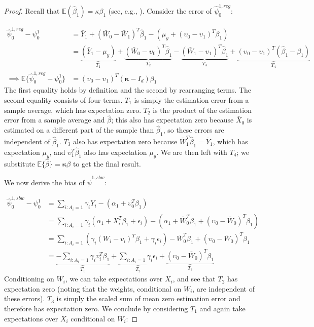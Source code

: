 \begin{proof}
Recall that $\mathbb{E}(\hat{\beta}_1) = \kappa\beta_1$ (see, e.g., \cite{gleser1992importance}). Consider the error of $\hat{\psi}^{1, reg}_0$: 

\begin{align*}
    \hat{\psi}^{1, reg}_0 - \psi^1_0 &= \bar{Y}_1 + (\bar{W}_0 - \bar{W}_1)^T\hat{\beta}_1 - (\mu_y + (\upsilon_0 - \upsilon_1)^T\beta_1) \\
    &= \underbrace{(\bar{Y}_1 - \mu_y)}_{T_1} + \underbrace{(\bar{W}_0 - \upsilon_0)^T\hat{\beta}_1}_{T_2} - \underbrace{(\bar{W}_1 - \upsilon_1)^T\hat{\beta}_1}_{T_3} + \underbrace{(\upsilon_0 - \upsilon_1)^T(\hat{\beta}_1 - \beta_1)}_{T_4} \\
    \implies \mathbb{E}\{\hat{\psi}^{1, reg}_0 - \psi^1_0\} &= (\upsilon_0 - \upsilon_1)^T(\mathbf{\kappa} - I_d)\beta_1
\end{align*}
%
The first equality holds by definition and the second by rearranging terms. The second equality consists of four terms. $T_1$ is simply the estimation error from a sample average, which has expectation zero. $T_2$ is the product of the estimation error from a sample average and $\hat{\beta}$; this also has expectation zero because $\bar{X}_0$ is estimated on a different part of the sample than $\hat{\beta}_1$, so these errors are independent of $\hat{\beta}_1$. $T_3$ also has expectation zero because $\bar{W}_1^T\hat{\beta}_1 = \bar{Y}_1$, which has expectation $\mu_y$, and $\upsilon_1^T\hat{\beta}_1$ also has expectation $\mu_y$. We are then left with $T_4$; we substitute $\mathbb{E}\{\hat{\beta}\} = \mathbf{\kappa}\beta$ to get the final result. 

We now derive the bias of $\hat{\psi}^{1, sbw}$:

\begin{align*}
    \hat{\psi}^{1, sbw}_0 - \psi^1_0 &= \sum_{i: A_i = 1}\gamma_iY_i - (\alpha_1 + \upsilon_0^T\beta_1) \\
    &= \sum_{i: A_i = 1} \gamma_i(\alpha_1 + X_i^T\beta_1 + \epsilon_i) - (\alpha_1 + \bar{W}_0^T\beta_1 + (\upsilon_0 - \bar{W}_0)^T\beta_1) \\
    &= \sum_{i: A_i = 1} (\gamma_i(W_i - v_i)^T\beta_1 + \gamma_i\epsilon_i) - \bar{W}_0^T\beta_1 + (\upsilon_0 - \bar{W}_0)^T\beta_1 \\
    &= \underbrace{-\sum_{i: A_i = 1}\gamma_iv_i^T\beta_1}_{T_1} + \underbrace{\sum_{i: A_i = 1}\gamma_i\epsilon_i}_{T_2}  + \underbrace{(\upsilon_0 - \bar{W}_0)^T\beta_1}_{T_3}
\end{align*}
%
Conditioning on $W_i$, we can take expectations over $X_i$, and see that $T_2$ has expectation zero (noting that the weights, conditional on $W_i$, are independent of these errors). $T_3$ is simply the scaled sum of mean zero estimation error and therefore has expectation zero. We conclude by considering $T_1$ and again take expectations over $X_i$ conditional on $W_i$: 


\end{proof}
